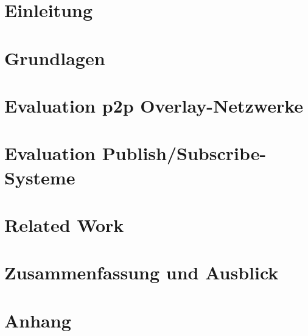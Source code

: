 
\chapter{Einleitung}
\label{chap:einleitung}


\chapter{Grundlagen}
\label{chap:grundlagen}


\chapter{Evaluation p2p Overlay-Netzwerke}
\label{chap:evaluation_p2p}


\chapter{Evaluation Publish/Subscribe-Systeme}
\label{chap:evaluation_pubsub}


\chapter{Related Work}
\label{chap:related}



\chapter{Zusammenfassung und Ausblick} 
\label{chap:zus}


\appendix

\chapter{Anhang}

